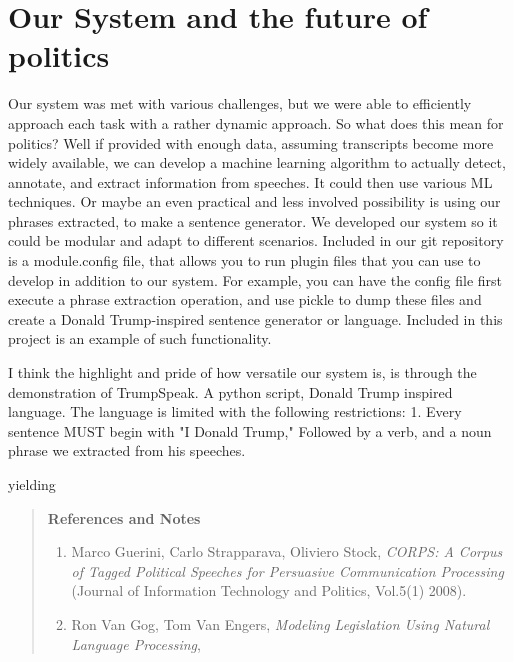 \documentclass[12pt]{article}
\begin{document}
\section{Our System and the future of politics}
\par{Our system was met with various challenges, but we were able to efficiently approach each task with a rather dynamic approach. So what does this mean for politics? Well if provided with enough data, assuming transcripts become more widely available, we can develop a machine learning algorithm to actually detect, annotate, and extract information from speeches. It could then use various ML techniques. Or maybe an even practical and less involved possibility is using our phrases extracted, to make a sentence generator. We developed our system so it could be modular and adapt to different scenarios. Included in our git repository is a module.config file, that allows you to run plugin files that you can use to develop in addition to our system. For example, you can have the config file first execute a phrase extraction operation, and use pickle to dump these files and create a Donald Trump-inspired sentence generator or language. Included in this project is an example of such functionality.}
\par{I think the highlight and pride of how versatile our system is, is through the demonstration of TrumpSpeak. A python script, Donald Trump inspired language. The language is limited with the following restrictions: 1. Every sentence MUST begin with "I Donald Trump," Followed by a verb, and a noun phrase we extracted from his speeches.}




\noindent yielding

\begin{quote}
{\bf References and Notes}

\begin{enumerate}
\item Marco Guerini, Carlo Strapparava, Oliviero Stock, {\it CORPS: A Corpus of Tagged Political Speeches for Persuasive Communication Processing\/} (Journal of Information Technology and Politics, Vol.5(1) 2008).
\item Ron Van Gog, Tom Van Engers, {\it Modeling Legislation Using Natural Language Processing},

\end{enumerate}
\end{quote}
\end{document}
